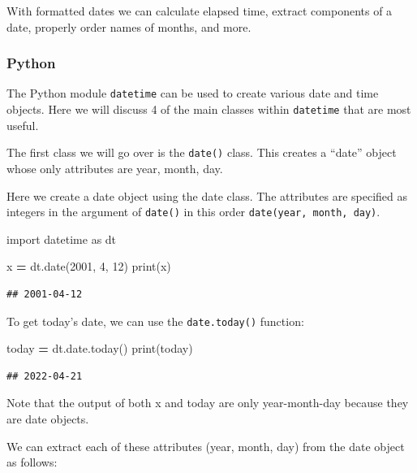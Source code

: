 \documentclass[
]{book}
\newenvironment{Shaded}{\begin{snugshade}}{\end{snugshade}}
\newcommand{\BuiltInTok}[1]{#1}
\newcommand{\DecValTok}[1]{\textcolor[rgb]{0.00,0.00,0.81}{#1}}
\newcommand{\ImportTok}[1]{#1}
\newcommand{\NormalTok}[1]{#1}
\newcommand{\OperatorTok}[1]{\textcolor[rgb]{0.81,0.36,0.00}{\textbf{#1}}}
\begin{document}
With formatted dates we can calculate elapsed time, extract components of a date, properly order names of months, and more.

\hypertarget{python-28}{%
\subsubsection*{Python}\label{python-28}}

The Python module \texttt{datetime} can be used to create various date and time objects. Here we will discuss 4 of the main classes within \texttt{datetime} that are most useful.

The first class we will go over is the \texttt{date()} class. This creates a ``date'' object whose only attributes are year, month, day.

Here we create a date object using the date class. The attributes are specified as integers in the argument of \texttt{date()} in this order \texttt{date(year,\ month,\ day)}.

\begin{Shaded}
\begin{Highlighting}[]
\ImportTok{import}\NormalTok{ datetime }\ImportTok{as}\NormalTok{ dt }

\NormalTok{x }\OperatorTok{=}\NormalTok{ dt.date(}\DecValTok{2001}\NormalTok{, }\DecValTok{4}\NormalTok{, }\DecValTok{12}\NormalTok{)}
\BuiltInTok{print}\NormalTok{(x)}
\end{Highlighting}
\end{Shaded}

\begin{verbatim}
## 2001-04-12
\end{verbatim}

To get today's date, we can use the \texttt{date.today()} function:

\begin{Shaded}
\begin{Highlighting}[]
\NormalTok{today }\OperatorTok{=}\NormalTok{ dt.date.today()}
\BuiltInTok{print}\NormalTok{(today)}
\end{Highlighting}
\end{Shaded}

\begin{verbatim}
## 2022-04-21
\end{verbatim}

Note that the output of both x and today are only year-month-day because they are date objects.

We can extract each of these attributes (year, month, day) from the date object as follows:
\end{document}
